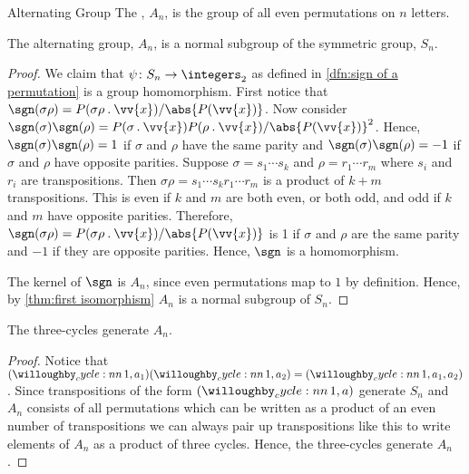 \begin{dfn}{Alternating Group}{}
    The , \(A_n\), is the group of all even permutations on \(n\) letters.
\end{dfn}

\begin{thm}{}{}
    The alternating group, \(A_n\), is a normal subgroup of the symmetric group, \(S_n\).
    \begin{proof}
        We claim that \(\psi \colon S_n \to \integers_2\) as defined in \cref{dfn:sign of a permutation} is a group homomorphism.
        First notice that \(\sgn(\sigma\rho) = P(\sigma\rho\action \vv{x})/\abs{P(\vv{x})}\).
        Now consider \(\sgn(\sigma)\sgn(\rho) = P(\sigma\action\vv{x})P(\rho\action\vv{x})/\abs{P(\vv{x})}^2\).
        Hence, \(\sgn(\sigma)\sgn(\rho) = 1\)  if \(\sigma\) and \(\rho\) have the same parity and \(\sgn(\sigma)\sgn(\rho) = -1\) if \(\sigma\) and \(\rho\) have opposite parities.
        Suppose \(\sigma = s_1\dotsm s_k\) and \(\rho = r_1\dotsm r_m\) where \(s_i\) and \(r_i\) are transpositions.
        Then \(\sigma\rho = s_1\dotsm s_k r_1 \dotsm r_m\) is a product of \(k + m\) transpositions.
        This is even if \(k\) and \(m\) are both even, or both odd, and odd if \(k\) and \(m\) have opposite parities.
        Therefore, \(\sgn(\sigma\rho) = P(\sigma\rho\action\vv{x})/\abs{P(\vv{x})}\) is 1 if \(\sigma\) and \(\rho\) are the same parity and \(-1\) if they are opposite parities.
        Hence, \(\sgn\) is a homomorphism.
        
        The kernel of \(\sgn\) is \(A_n\), since even permutations map to \(1\) by definition.
        Hence, by \cref{thm:first isomorphism} \(A_n\) is a normal subgroup of \(S_n\).
    \end{proof}
\end{thm}

\begin{lma}{}{}
    The three-cycles generate \(A_n\).
    \begin{proof}
        Notice that \(\cycle{1, a_1}\cycle{1, a_2} = \cycle{1, a_1, a_2}\).
        Since transpositions of the form \(\cycle{1, a}\) generate \(S_n\) and \(A_n\) consists of all permutations which can be written as a product of an even number of transpositions we can always pair up transpositions like this to write elements of \(A_n\) as a product of three cycles.
        Hence, the three-cycles generate \(A_n\).
    \end{proof}
\end{lma}

